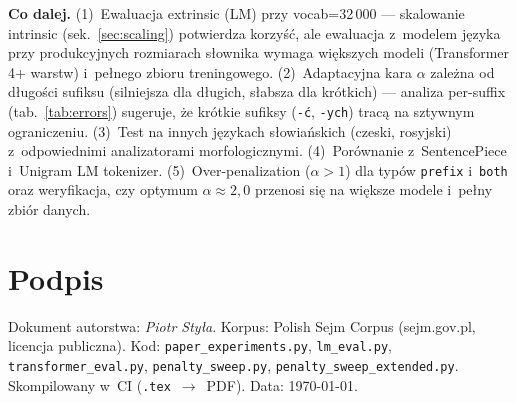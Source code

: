 \textbf{Co dalej.}
(1)~Ewaluacja extrinsic (LM) przy vocab=32\,000 --- skalowanie intrinsic
(sek.~\ref{sec:scaling}) potwierdza korzyść, ale ewaluacja z~modelem
języka przy produkcyjnych rozmiarach słownika wymaga większych modeli
(Transformer 4+ warstw) i~pełnego zbioru treningowego.
(2)~Adaptacyjna kara $\alpha$ zależna od długości sufiksu
(silniejsza dla długich, słabsza dla krótkich) --- analiza
per-suffix (tab.~\ref{tab:errors}) sugeruje, że krótkie sufiksy
(\texttt{-ć}, \texttt{-ych}) tracą na sztywnym ograniczeniu.
(3)~Test na innych językach słowiańskich (czeski, rosyjski)
z~odpowiednimi analizatorami morfologicznymi.
(4)~Porównanie z~SentencePiece i~Unigram LM tokenizer.
(5)~Over-penalization ($\alpha > 1$) dla typów \texttt{prefix}
i~\texttt{both} oraz weryfikacja, czy optymum $\alpha \approx 2{,}0$
przenosi się na większe modele i~pełny zbiór danych.

\section*{Podpis}
Dokument autorstwa: \emph{Piotr Styła}.
Korpus: Polish Sejm Corpus (sejm.gov.pl, licencja publiczna).
Kod: \texttt{paper\_experiments.py}, \texttt{lm\_eval.py},
\texttt{transformer\_eval.py}, \texttt{penalty\_sweep.py},
\texttt{penalty\_sweep\_extended.py}.
Skompilowany w~CI (\texttt{.tex}~$\to$~PDF).
Data: \today.
